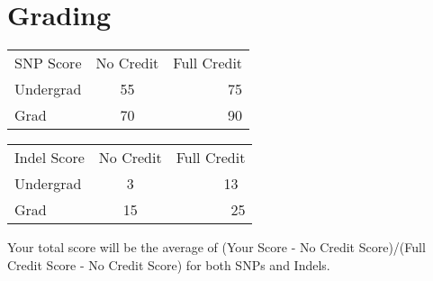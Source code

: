 \documentclass{article}
\begin{document}
\section*{Grading}

\begin{tabular}{ l c r }
  SNP Score & No Credit & Full Credit \\
  Undergrad & 55 & 75 \\
  Grad & 70 & 90 \\
\end{tabular}

\vspace{3cm}

\begin{tabular}{ l c r }
  Indel Score & No Credit & Full Credit \\
  Undergrad & 3 & 13\ \\
  Grad & 15 & 25 \\
\end{tabular}

Your total score will be the average of (Your Score - No Credit Score)/(Full Credit Score - No Credit Score) for both SNPs and Indels.
\end{document}

